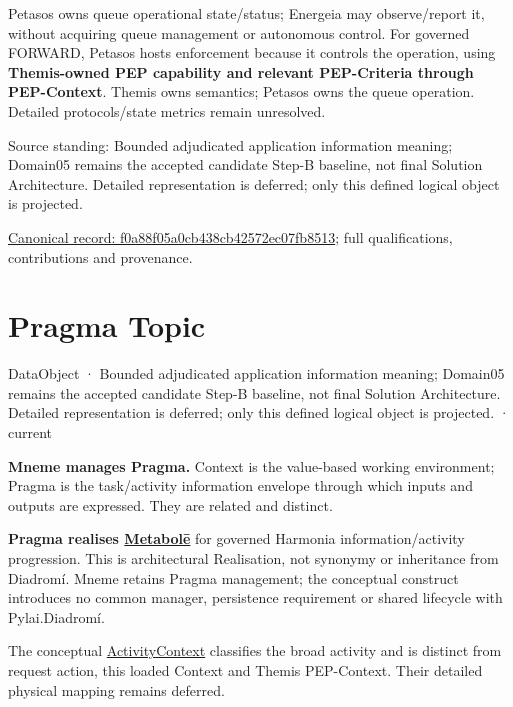 Petasos owns queue operational state/status; Energeia may observe/report it,
without acquiring queue management or autonomous control. For governed FORWARD,
Petasos hosts enforcement because it controls the operation, using \textbf{Themis-owned
PEP capability and relevant PEP-Criteria through PEP-Context}. Themis owns semantics; Petasos
owns the queue operation. Detailed protocols/state metrics remain unresolved.



Source standing: Bounded adjudicated application information meaning; Domain05 remains the accepted candidate Step-B baseline, not final Solution Architecture. Detailed representation is deferred; only this defined logical object is projected.


{\footnotesize \href{../../../../continuum/application/data-object/f0a88f05a0cb438cb42572ec07fb8513.md}{Canonical record: f0a88f05a0cb438cb42572ec07fb8513}; full qualifications, contributions and provenance.}\par
\section{Pragma Topic}

\label{element:27ad143e7c784e378556af8a57c438f7}
{\small DataObject · Bounded adjudicated application information meaning; Domain05 remains the accepted candidate Step-B baseline, not final Solution Architecture. Detailed representation is deferred; only this defined logical object is projected. · current}\par

\textbf{Mneme manages Pragma.} Context is the value-based working environment;
Pragma is the task/activity information envelope through which inputs and outputs
are expressed. They are related and distinct.



\textbf{Pragma realises \hyperref[element:c34b4929f71946708d37dbe6c1da920a]{Metabolē}}
for governed Harmonia information/activity progression. This is architectural
Realisation, not synonymy or inheritance from Diadromí. Mneme retains Pragma
management; the conceptual construct introduces no common manager, persistence
requirement or shared lifecycle with Pylai.Diadromí.



The conceptual
\hyperref[element:c34b4929f71946708d37dbe6c1da920a]{ActivityContext}
classifies the broad activity and is distinct from request action, this loaded
Context and Themis PEP-Context. Their detailed physical mapping remains deferred.



